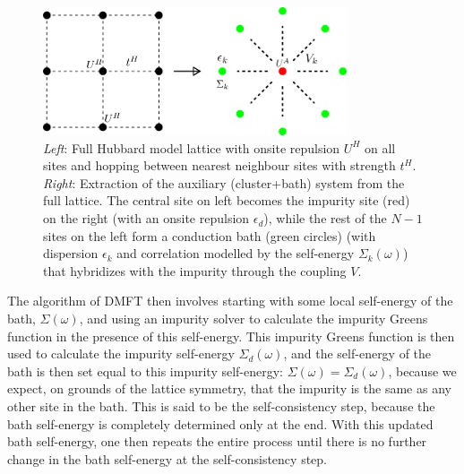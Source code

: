 \documentclass[12pt]{article}
\numberwithin{equation}{section}
\begin{document}
\begin{figure}[htpb!]
	\centering
	\includegraphics[width=0.8\textwidth]{./cluster-bath.png}
	\caption{\textit{Left}: Full Hubbard model lattice with onsite repulsion $U^H$ on all sites and hopping between nearest neighbour sites with strength $t^H$. \textit{Right}: Extraction of the auxiliary (cluster+bath) system from the full lattice. The central site on left becomes the impurity site (red) on the right (with an onsite repulsion $\epsilon_d$), while the rest of the $N-1$ sites on the left form a conduction bath (green circles) (with dispersion $\epsilon_k$ and correlation modelled by the self-energy $\Sigma_k(\omega)$) that hybridizes with the impurity through the coupling $V$.}
	\label{cluster-bath}
\end{figure}


The algorithm of DMFT then involves starting with some local self-energy of the bath, \(\Sigma(\omega)\), and using an impurity solver to calculate the impurity Greens function in the presence of this self-energy. This impurity Greens function is then used to calculate the impurity self-energy \(\Sigma_d(\omega)\), and the self-energy of the bath is then set equal to this impurity self-energy: \(\Sigma(\omega) = \Sigma_d(\omega)\), because we expect, on grounds of the lattice symmetry, that the impurity is the same as any other site in the bath. This is said to be the self-consistency step, because the bath self-energy is completely determined only at the end. With this updated bath self-energy, one then repeats the entire process until there is no further change in the bath self-energy at the self-consistency step.
\end{document}
